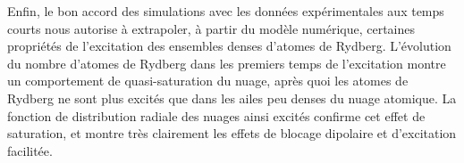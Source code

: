 %

Enfin, le bon accord des simulations avec les données expérimentales aux temps courts nous autorise à extrapoler, à partir du modèle numérique, certaines propriétés de l'excitation des ensembles denses d'atomes de Rydberg.
L'évolution du nombre d'atomes de Rydberg dans les premiers temps de l'excitation montre un comportement de quasi-saturation du nuage, après quoi les atomes de Rydberg ne sont plus excités que dans les ailes peu denses du nuage atomique.
La fonction de distribution radiale des nuages ainsi excités confirme cet effet de saturation, et montre très clairement les effets de blocage dipolaire et d'excitation facilitée.